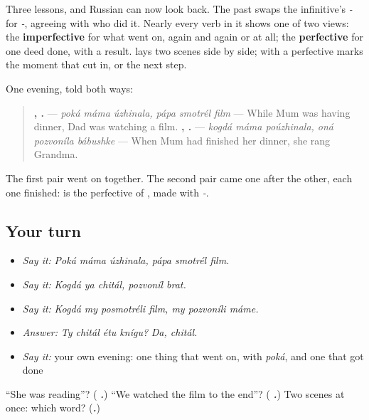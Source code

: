 \begin{grammarlens}[title={What you've built}]
Three lessons, and Russian can now look back. The past swaps the infinitive's \emph{-} for \emph{-}, agreeing with who did it. Nearly every verb in it shows one of two views: the \textbf{imperfective} for what went on, again and again or at all; the \textbf{perfective} for one deed done, with a result. \textbf{} lays two scenes side by side; \textbf{} with a perfective marks the moment that cut in, or the next step.

One evening, told both ways:

\begin{quote}
\textbf{  ,   .} — \emph{poká máma úzhinala, pápa smotrél film} — While Mum was having dinner, Dad was watching a film. \textbf{  ,   .} — \emph{kogdá máma poúzhinala, oná pozvoníla bábushke} — When Mum had finished her dinner, she rang Grandma.
\end{quote}

The first pair went on together. The second pair came one after the other, each one finished: \emph{} is the perfective of \emph{}, made with \emph{-}.
\end{grammarlens}

\subsection*{Your turn}
\begin{itemize}
\raggedright
  \item \emph{Say it:} \emph{Poká máma úzhinala, pápa smotrél film.}
  \item \emph{Say it:} \emph{Kogdá ya chitál, pozvoníl brat.}
  \item \emph{Say it:} \emph{Kogdá my posmotréli film, my pozvoníli máme.}
  \item \emph{Answer:} \emph{Ty chitál étu knígu?} \emph{Da, chitál.}
  \item \emph{Say it:} your own evening: one thing that went on, with \emph{poká}, and one that got done
\end{itemize}

\begin{tcolorbox}[breakable,colback=teal!4,colframe=teal!35!black,title={Before you move on}]
\textquotedblleft{}She was reading\textquotedblright{}? (\emph{\textbf{ .}}) \textquotedblleft{}We watched the film to the end\textquotedblright{}? (\emph{\textbf{  .}}) Two scenes at once: which word? (\emph{\textbf{.}})
\end{tcolorbox}
